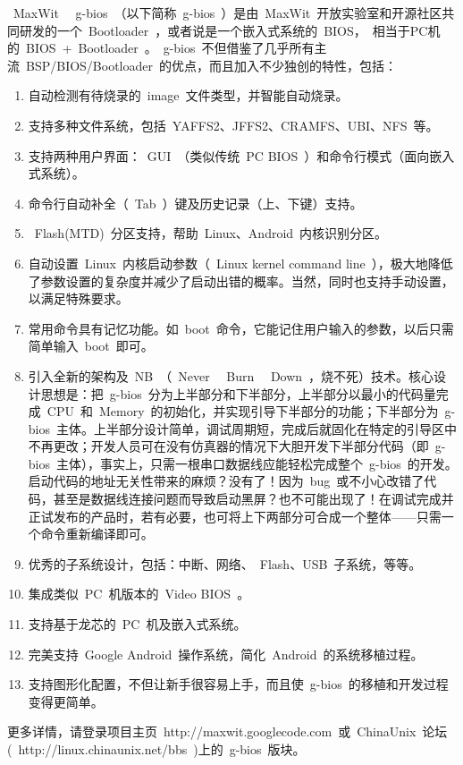 \documentclass[a4paper,11pt]{book}
\begin{document}
\begin{CJK*}{UTF8}{gbsn}
~MaxWit~ ~g-bios~（以下简称~g-bios~）是由~MaxWit~开放实验室和开源社区共同研发的一个~Bootloader~，或者说是一个嵌入式系统的~BIOS，~相当于PC机的~BIOS~+~Bootloader~。~g-bios~不但借鉴了几乎所有主流~BSP/BIOS/Bootloader~的优点，而且加入不少独创的特性，包括：
\begin{enumerate}[1)]\setlength{\itemsep}{-\itemsep}
\item 自动检测有待烧录的~image~文件类型，并智能自动烧录。
\item 支持多种文件系统，包括~YAFFS2、JFFS2、CRAMFS、UBI、NFS~等。
\item 支持两种用户界面：~GUI~（类似传统~PC BIOS~）和命令行模式（面向嵌入式系统）。
\item 命令行自动补全（~Tab~）键及历史记录（上、下键）支持。
\item ~Flash(MTD)~分区支持，帮助~Linux、Android~内核识别分区。
\item 自动设置~Linux~内核启动参数（~Linux kernel command line~），极大地降低了参数设置的复杂度并减少了启动出错的概率。当然，同时也支持手动设置，以满足特殊要求。
\item 常用命令具有记忆功能。如~boot~命令，它能记住用户输入的参数，以后只需简单输入~boot~即可。
\item 引入全新的架构及~NB~（~Never~ ~Burn~ ~Down~，烧不死）技术。核心设计思想是：把~g-bios~分为上半部分和下半部分，上半部分以最小的代码量完成~CPU~和~Memory~的初始化，并实现引导下半部分的功能；下半部分为~g-bios~主体。上半部分设计简单，调试周期短，完成后就固化在特定的引导区中不再更改；开发人员可在没有仿真器的情况下大胆开发下半部分代码（即~g-bios~主体），事实上，只需一根串口数据线应能轻松完成整个~g-bios~的开发。启动代码的地址无关性带来的麻烦？没有了！因为~bug~或不小心改错了代码，甚至是数据线连接问题而导致启动黑屏？也不可能出现了！在调试完成并正试发布的产品时，若有必要，也可将上下两部分可合成一个整体——只需一个命令重新编译即可。
\item 优秀的子系统设计，包括：中断、网络、~Flash、USB~子系统，等等。
\item 集成类似~PC~机版本的~Video BIOS~。
\item 支持基于龙芯的~PC~机及嵌入式系统。
\item 完美支持~Google Android~操作系统，简化~Android~的系统移植过程。
\item 支持图形化配置，不但让新手很容易上手，而且使~g-bios~的移植和开发过程变得更简单。
\end{enumerate}
更多详情，请登录项目主页~http://maxwit.googlecode.com~或~ChinaUnix~论坛(~http://linux.chinaunix.net/bbs~)上的~g-bios~版块。


\end{CJK*}
\end{document}
